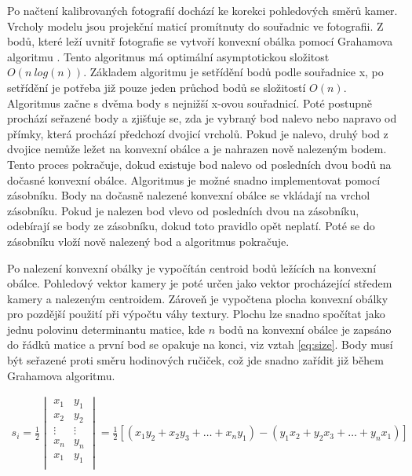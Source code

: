 \documentclass[11pt,twoside,a4paper]{book}
\begin{document}
Po načtení kalibrovaných fotografií dochází ke korekci pohledových směrů kamer. Vrcholy modelu jsou projekční maticí promítnuty do souřadnic ve fotografii. Z bodů, které leží uvnitř fotografie se vytvoří konvexní obálka pomocí Grahamova algoritmu \cite{Andrew79}.  Tento algoritmus má optimální asymptotickou složitost $O(n~log(n))$. Základem algoritmu je setřídění bodů podle souřadnice x, po setřídění je potřeba již pouze jeden průchod bodů se složitostí $O(n)$. Algoritmus začne s dvěma body s nejnižší x-ovou souřadnicí. Poté postupně prochází seřazené body a zjišťuje se, zda je vybraný bod nalevo nebo napravo od přímky, která prochází předchozí dvojicí vrcholů. Pokud je nalevo, druhý bod z dvojice nemůže ležet na konvexní obálce a je nahrazen nově nalezeným bodem. Tento proces pokračuje, dokud existuje bod nalevo od posledních dvou bodů na dočasné konvexní obálce. Algoritmus je možné snadno implementovat pomocí zásobníku. Body na dočasně nalezené konvexní obálce se vkládají na vrchol zásobníku. Pokud je nalezen bod vlevo od posledních dvou na zásobníku, odebírají se body ze zásobníku, dokud toto pravidlo opět neplatí. Poté se do zásobníku vloží nově nalezený bod a algoritmus pokračuje.

Po nalezení konvexní obálky je vypočítán centroid bodů ležících na konvexní obálce. Pohledový vektor kamery je poté určen jako vektor procházející středem kamery a nalezeným centroidem. Zároveň je vypočtena plocha konvexní obálky pro pozdější použití při výpočtu váhy textury. Plochu lze snadno spočítat jako jednu polovinu determinantu matice, kde $n$ bodů na konvexní obálce je zapsáno do řádků matice a první bod se opakuje na konci, viz vztah \ref{eq:size}. Body musí být seřazené proti směru hodinových ručiček, což jde snadno zařídit již během Grahamova algoritmu.

\begin{align}
\label{eq:size}
s_i = \frac{1}{2} 
\begin{vmatrix}
x_1 & y_1 \\
x_2 & y_2 \\
\vdots & \vdots \\
x_n & y_n \\
x_1 & y_1 \\
\end{vmatrix}
= \frac{1}{2} [(x_1 y_2 + x_2 y_3 + \ldots + x_n y_1) - (y_1 x_2 + y_2 x_3 + \ldots + y_n x_1)]
\end{align}
\end{document}
